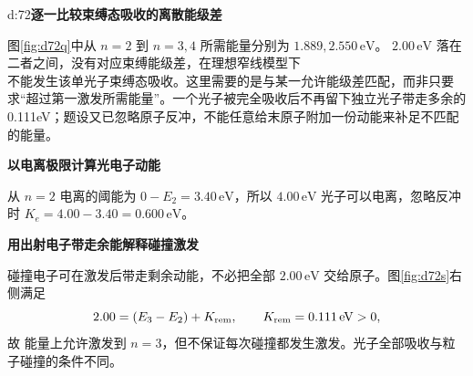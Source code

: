 \begin{drillsolution}{d:72}\textbf{逐一比较束缚态吸收的离散能级差}\par\nobreak
图\ref{fig:d72q}中从 \(n=2\) 到 \(n=3,4\) 所需能量分别为 \(1.889,2.550\,\mathrm{eV}\)。
\(2.00\,\mathrm{eV}\) 落在二者之间，没有对应束缚能级差，在理想窄线模型下 \(\boxed{\text{不能发生该单光子束缚态吸收}}\)。这里需要的是与某一允许能级差匹配，而非只要求“超过第一激发所需能量”。一个光子被完全吸收后不再留下独立光子带走多余的0.111eV；题设又已忽略原子反冲，不能任意给末原子附加一份动能来补足不匹配的能量。



\par\medskip{}\noindent\textbf{以电离极限计算光电子动能}\par\nobreak
从 \(n=2\) 电离的阈能为 \(0-E_2=3.40\,\mathrm{eV}\)，所以 \(4.00\,\mathrm{eV}\) 光子可以电离，忽略反冲时
\(\boxed{K_e=4.00-3.40=0.600\,\mathrm{eV}}\)。



\par\medskip{}\noindent\textbf{用出射电子带走余能解释碰撞激发}\par\nobreak
碰撞电子可在激发后带走剩余动能，不必把全部 \(2.00\,\mathrm{eV}\) 交给原子。图\ref{fig:d72s}右侧满足
\[
 2.00=(E_3-E_2)+K_{\rm rem},\qquad K_{\rm rem}=0.111\,\mathrm{eV}>0,
\]
故 \(\boxed{\text{能量上允许激发到 }n=3}\)，但不保证每次碰撞都发生激发。光子全部吸收与粒子碰撞的条件不同。
\end{drillsolution}

